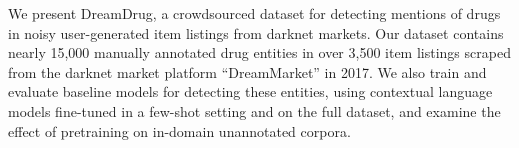 We present DreamDrug, a crowdsourced dataset for detecting mentions of drugs in noisy user-generated item listings from darknet markets. Our dataset contains nearly 15,000 manually annotated drug entities in over 3,500 item listings scraped from the darknet market platform ``DreamMarket'' in 2017. We also train and evaluate baseline models for detecting these entities, using contextual language models fine-tuned in a few-shot setting and on the full dataset, and examine the effect of pretraining on in-domain unannotated corpora.
